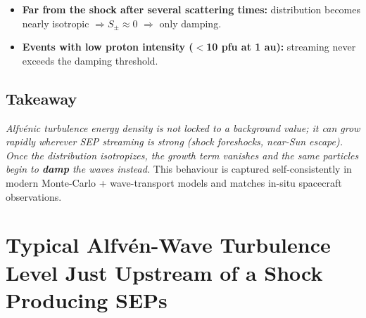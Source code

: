 \begin{itemize}
  \item \textbf{Far from the shock after several scattering times:} distribution becomes nearly isotropic $\Rightarrow S_\pm \approx 0$ $\Rightarrow$ only damping.
  \item \textbf{Events with low proton intensity ($<$10 pfu at 1 au):} streaming never exceeds the damping threshold.
\end{itemize}

\subsection*{Takeaway}

\textit{Alfvénic turbulence energy density is not locked to a background value; it can grow rapidly wherever SEP streaming is strong (shock foreshocks, near-Sun escape). Once the distribution isotropizes, the growth term vanishes and the same particles begin to \textbf{damp} the waves instead.} This behaviour is captured self-consistently in modern Monte-Carlo + wave-transport models and matches in-situ spacecraft observations.


\section*{Typical Alfvén-Wave Turbulence Level Just Upstream of a Shock Producing SEPs}


